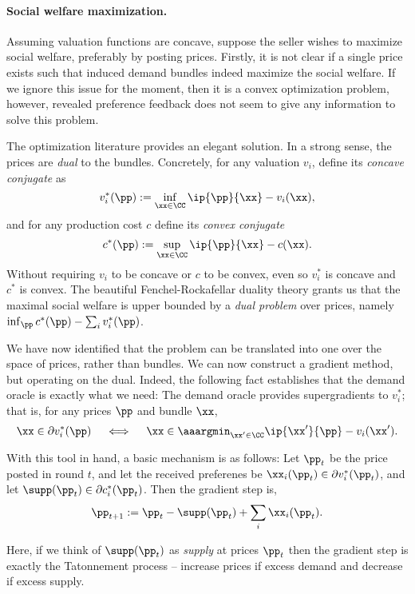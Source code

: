 \paragraph{Social welfare maximization.}
Assuming valuation functions are concave, suppose the seller wishes to maximize social welfare, preferably by posting prices. Firstly, it is not clear if a single price exists such that induced demand bundles indeed maximize the social welfare. If we ignore this issue for the moment, then it is a convex optimization problem, however, revealed preference feedback does not seem to give any information to solve this problem. 

The optimization literature provides an elegant solution.
In a strong sense, the prices are \emph{dual} to the bundles.
Concretely, for any valuation $v_i$, define its \emph{concave conjugate}
as
\[
  v_i^*(\pp) := \inf_{\xx\in\CC} \ip{\pp}{\xx} - v_i(\xx),
\]
and for any production cost $c$ define its \emph{convex conjugate}
\[
  c^*(\pp) := \sup_{\xx\in\CC} \ip{\pp}{\xx} - c(\xx).
\]
Without requiring $v_i$ to be concave or $c$ to be convex,
even so $v_i^*$ is concave and $c^*$ is convex.
The beautiful Fenchel-Rockafellar duality theory grants us that the maximal social
welfare is upper bounded by a \emph{dual problem} over prices,
namely $\inf_{\pp} c^*(\pp) - \sum_i v_i^*(\pp)$.

We have now identified that the problem can be translated into one over the space of
prices, rather than bundles.  We can now construct a gradient method, but
operating on the dual.  Indeed, the following fact establishes that the
demand oracle is exactly what we need: The demand oracle provides supergradients to $v_i^*$;
  that is, for any prices $\pp$ and bundle $\xx$,
  \[
    \xx \in \partial v_i^*(\pp) \quad \iff \quad \xx \in \aaargmin_{\xx'\in\CC} \ip{\xx'}{\pp} - v_i(\xx').
  \]

With this tool in hand, a basic mechanism is as follows: Let $\pp_t$ be the price posted in round $t$, and let the received preferenes be 
$\xx_i(\pp_t) \in \partial v_i^*(\pp_t)$, and let $\supp(\pp_t) \in \partial c_i^*(\pp_t)$. Then the gradient step is, 
$$ \pp_{t+1} := \pp_t - \supp(\pp_t) + \sum_i \xx_i(\pp_t).$$


Here, if we think of $\supp(\pp_t)$ as {\em supply} at prices $\pp_t$ then the gradient step is exactly the Tatonnement process -- increase prices if excess demand and decrease if excess supply. 

